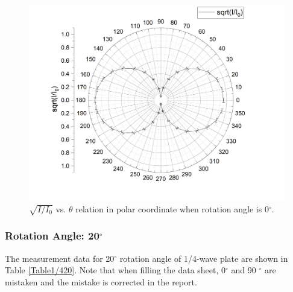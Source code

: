 \documentclass{article}
\begin{document}
\begin{figure}[H]\centering
\includegraphics[scale=0.45]{3.png}
\caption{$\sqrt{I/I_0}$ vs. $\theta$ relation in polar coordinate when rotation angle is 0$^\circ$.}\label{Fig0}
\end{figure}


\subsubsection{Rotation Angle: 20$^\circ$}

The measurement data for 20$^\circ$ rotation angle of 1/4-wave plate are shown in Table \ref{Table1/420}.  Note that when filling the data sheet, 0$^\circ$ and 90 $^\circ$ are mistaken and the mistake is corrected in the report.
\end{document}
